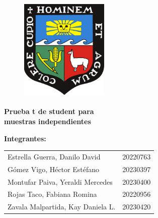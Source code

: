 \documentclass[
]{article}
\author{}
\date{\vspace{-2.5em}}
\begin{document}
\begin{titlepage}
\begin{center}
\vspace*{\baselineskip}

{\bf\fontsize{19}{0}{\selectfont{ UNIVERSIDAD NACIONAL   AGRARIA \\ [0.5cm] LA MOLINA}}\\[0.5cm]
\\ [0.5cm]
\bf\fontsize{14}{0}{\selectfont{ CARRERA PROFESIONAL DE ESTADÍSTICA E INFORMÁTICA}}
}\\[0.5cm]
\end{center}
\begin{center}
\vspace*{0.3in}
\begin{figure}[htb]
\begin{center}
\includegraphics[width=4.2cm,height=5cm]{imagen.jpg}
\end{center}
\end{figure}
\vspace*{0.1in}
\begin{Large}
\textbf{Prueba t de student para \\  muestras independientes } \\
\end{Large}
\vspace{0.4cm}
\begin{large}

\begin{center}
\textbf{Integrantes:}
\end{center}  

\begin{table}[h!]
\centering
\renewcommand{\arraystretch}{1.5} %
\begin{tabular}{p{8cm}r}
Estrella Guerra, Danilo David \dotfill & 20220763 \\ 
Gómez Vigo, Héctor Estéfano \dotfill & 20230397 \\ 
Montufar Paiva, Yeraldi Mercedes \dotfill   & 20230400 \\ 
Rojas Taco, Fabiana Romina \dotfill & 20220956 \\ 
Zavala Malpartida, Kay Daniela L. \dotfill  & 20230420 \\ 
\end{tabular}
\end{table}


\end{large}
\end{center}
\end{titlepage}
\end{document}

